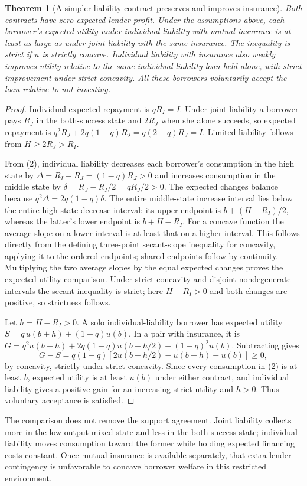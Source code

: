 \documentclass[11pt]{article}
\newtheorem{theorem}{Theorem}
\theoremstyle{remark}
\begin{document}
\begin{theorem}[A simpler liability contract preserves and improves insurance]
Both contracts have zero expected lender profit. Under the assumptions
above, each borrower's expected utility under individual liability with
mutual insurance is at least as large as under joint liability with the
same insurance. The inequality is strict if $u$ is strictly concave.
Individual liability with insurance also weakly improves utility relative
to the same individual-liability loan held alone, with strict improvement
under strict concavity. All these borrowers voluntarily accept the loan
relative to not investing.
\end{theorem}
\begin{proof}
Individual expected repayment is $qR_I=I$. Under joint liability a
borrower pays $R_J$ in the both-success state and $2R_J$ when she alone
succeeds, so expected repayment is
$q^2R_J+2q(1-q)R_J=q(2-q)R_J=I$.
Limited liability follows from $H\geq2R_J>R_I$.

From (2), individual liability decreases each borrower's consumption in
the high state by
$\Delta=R_I-R_J=(1-q)R_J>0$ and increases consumption in the
middle state by $\delta=R_J-R_I/2=qR_J/2>0$.
The expected changes balance because
$q^2\Delta=2q(1-q)\delta$.
The entire middle-state increase interval lies below the entire high-state
decrease interval: its upper endpoint is
$b+(H-R_I)/2$, whereas the latter's lower endpoint is $b+H-R_I$.
For a concave function the average slope on a lower interval is at least
that on a higher interval. This follows directly from the defining
three-point secant-slope inequality for concavity, applying it to the
ordered endpoints; shared endpoints follow by continuity. Multiplying
the two average slopes by the equal expected changes proves the expected
utility comparison. Under strict concavity and disjoint nondegenerate
intervals the secant inequality is strict; here $H-R_I>0$ and both changes
are positive, so strictness follows.

Let $h=H-R_I>0$. A solo individual-liability borrower has expected utility
$S=q\,u(b+h)+(1-q)u(b)$. In a pair with insurance, it is
$G=q^2u(b+h)+2q(1-q)u(b+h/2)+(1-q)^2u(b)$.
Subtracting gives
\[
 G-S=q(1-q)[2u(b+h/2)-u(b+h)-u(b)]\geq0, \tag{3}
\]
by concavity, strictly under strict concavity. Since every consumption in
(2) is at least $b$, expected utility is at least $u(b)$ under either
contract, and individual liability gives a positive gain for an increasing
strict utility and $h>0$. Thus voluntary acceptance is satisfied.
\end{proof}
The comparison does not remove the support agreement. Joint liability
collects more in the low-output mixed state and less in the both-success
state; individual liability moves consumption toward the former while
holding expected financing costs constant. Once mutual insurance is
available separately, that extra lender contingency is unfavorable to
concave borrower welfare in this restricted environment.
\end{document}
